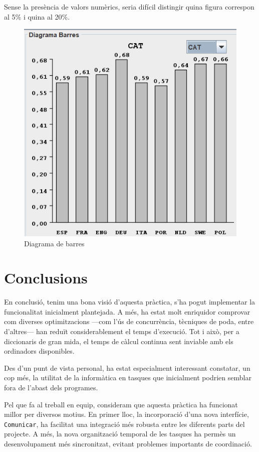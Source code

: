 \documentclass{ieeetj}
\begin{document}
Sense la presència de valors numèrics, seria difícil distingir quina figura correspon al 5\% i quina al 20\%.

\begin{figure}[H]
    \centering
    \includegraphics[width=\linewidth]{png/barres5p.png}
    \caption{Diagrama de barres}
    \label{fig:enter-label}
\end{figure}
\section{Conclusions}

En conclusió, tenim una bona visió d'aquesta pràctica, s’ha pogut implementar la funcionalitat inicialment plantejada. A més, ha estat molt enriquidor comprovar com diverses optimitzacions —com l’ús de concurrència, tècniques de poda, entre d’altres— han reduït considerablement el temps d’execució. Tot i això, per a diccionaris de gran mida, el temps de càlcul continua sent inviable amb els ordinadors disponibles.

Des d’un punt de vista personal, ha estat especialment interessant constatar, un cop més, la utilitat de la informàtica en tasques que inicialment podrien semblar fora de l’abast dels programes.

Pel que fa al treball en equip, consideram que aquesta pràctica ha funcionat millor per diversos motius. En primer lloc, la incorporació d’una nova interfície, \texttt{Comunicar}, ha facilitat una integració més robusta entre les diferents parts del projecte. A més, la nova organització temporal de les tasques ha permès un desenvolupament més sincronitzat, evitant problemes importants de coordinació.
\end{document}
